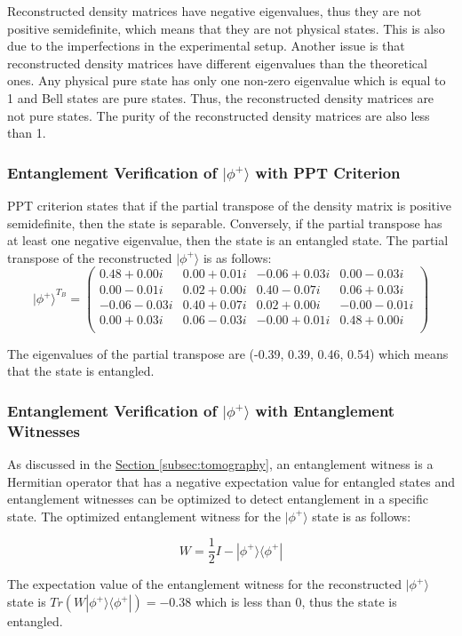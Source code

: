 Reconstructed density matrices have negative eigenvalues, thus they are not positive semidefinite,
which means that they are not physical states. This is also due to the imperfections in the experimental setup.
Another issue is that reconstructed density matrices have different eigenvalues than the theoretical ones.
Any physical pure state has only one non-zero eigenvalue which is equal to 1 and Bell states are pure states.
Thus, the reconstructed density matrices are not pure states.
The purity of the reconstructed density matrices are also less than 1.

\subsubsection{Entanglement Verification of \texorpdfstring{$|\phi^+\rangle$}{|phi+>} with PPT Criterion}
PPT criterion states that if the partial transpose of the density matrix is positive semidefinite,
then the state is separable. Conversely, if the partial transpose has at least one negative eigenvalue,
then the state is an entangled state. The partial transpose of the reconstructed $|\phi^+\rangle$ is as follows:
\begin{equation}
    {|\phi^+\rangle}^{T_B} = \begin{pmatrix}
        0.48 + 0.00i & 0.00 + 0.01i & -0.06 + 0.03i & 0.00 - 0.03i \\
        0.00 - 0.01i & 0.02 + 0.00i & 0.40 - 0.07i & 0.06 + 0.03i \\
        -0.06 - 0.03i & 0.40 + 0.07i & 0.02 + 0.00i & -0.00 - 0.01i \\
        0.00 + 0.03i & 0.06 - 0.03i & -0.00 + 0.01i & 0.48 + 0.00i \\
    \end{pmatrix}
\end{equation}

The eigenvalues of the partial transpose are (-0.39, 0.39, 0.46, 0.54) which means that the state is entangled.

\subsubsection{Entanglement Verification of \texorpdfstring{$|\phi^+\rangle$}{|phi+>} with Entanglement Witnesses}
As discussed in the \hyperref[subsec:tomography]{Section \ref*{subsec:tomography}},
an entanglement witness is a Hermitian operator that has a negative expectation value for entangled states and
entanglement witnesses can be optimized to detect entanglement in a specific state.
The optimized entanglement witness for the $|\phi^+\rangle$ state is as follows:

\begin{equation}
    W = \frac{1}{2} I - |\phi^+\rangle\langle\phi^+|
\end{equation}

The expectation value  of the entanglement witness for the reconstructed
$|\phi^+\rangle$ state is $Tr(W|\phi^+\rangle\langle\phi^+|) = -0.38$ which is less than 0, thus the state is entangled.